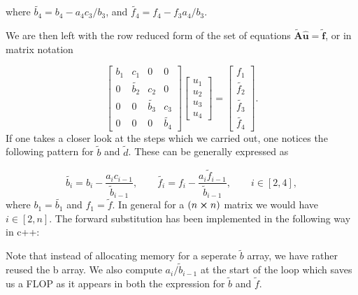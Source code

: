 \documentclass[a4paper,10pt]{article}
\begin{document}
where $\tilde{b_4} = b_4 - a_4c_3/b_3$, and $\tilde{f_4} = f_4 - f_3a_4/b_3$. 

\newpage

We are then left with the row reduced form of the set of equations $\tilde{\mathbf{A}}\mathbf{\hat{u}} = \tilde{\mathbf{f}}$, or in matrix notation

\begin{equation}\label{eq:7}
\begin{bmatrix}
b_1 & c_1 & 0 & 0 \\
0& \tilde{b_2}  & c_2 & 0 \\
0 & 0 & \tilde{b_3} & c_3 \\
0 & 0 & 0 & \tilde{b_4} 
\end{bmatrix} \begin{bmatrix}
u_1\\
u_2\\
u_3\\
u_4
\end{bmatrix} = \begin{bmatrix}
f_1\\
\tilde{f_2}\\
\tilde{f_3}\\
\tilde{f_4}
\end{bmatrix}.
\end{equation}
If one takes a closer look at the steps which we carried out, one notices the following pattern for $\tilde{b}$ and $\tilde{d}$. These can be generally expressed as

\begin{equation}\label{eq:8}
\tilde{b_i} = b_i - \frac{a_i c_{i-1}}{\tilde{b}_{i-1}}, \qquad 
\tilde{f_i} = f_i - \frac{a_i \tilde{f}_{i-1}}{\tilde{b}_{i-1}}, \qquad i \in [2,4],
\end{equation}
where $b_1 = \tilde{b_1}$ and $f_1 = \tilde{f}$. In general for a $(n \cross n)$ matrix we would have $i \in [2,n]$. 
The forward substitution has been implemented in the following way in c++:


Note that instead of allocating memory for a seperate $\tilde{b}$ array, we have rather reused the b array. We also compute $a_i / \tilde{b}_{i-1}$ at the start of the loop which saves us a FLOP as it appears in both the expression for $\tilde{b}$ and $\tilde{f}$.
\end{document}
